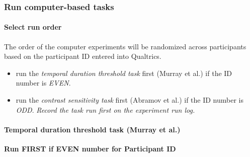 \documentclass[]{article}
\providecommand{\tightlist}{%
  \setlength{\itemsep}{0pt}\setlength{\parskip}{0pt}}
\let\oldparagraph\paragraph
\renewcommand{\paragraph}[1]{\oldparagraph{#1}\mbox{}}
\begin{document}
\subsubsection{Run computer-based tasks}\label{run-computer-based-tasks}

\paragraph{Select run order}\label{select-run-order}

The order of the computer experiments will be randomized across
participants based on the participant ID entered into Qualtrics.

\begin{itemize}
\tightlist
\item
  run the \emph{temporal duration threshold task} first (Murray et al.)
  if the ID number is \emph{EVEN}.
\item
  run the \emph{contrast sensitivity task} first (Abramov et al.) if the
  ID number is \emph{ODD}. \emph{Record the task run first on the
  experiment run log.}
\end{itemize}

\paragraph{Temporal duration threshold task (Murray et
al.)}\label{temporal-duration-threshold-task-murray-et-al.}

\textbf{Run FIRST if EVEN number for Participant ID}
\end{document}
